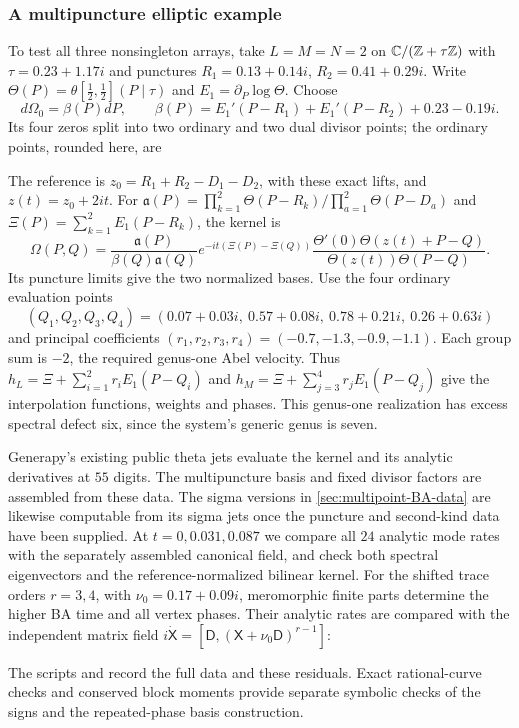 \subsubsection{A multipuncture elliptic example}
\label{sec:numeric-multipoint}

To test all three nonsingleton arrays, take $L=M=N=2$ on
$\mathbb C/(\mathbb Z+\tau\mathbb Z)$ with $\tau=0.23+1.17i$ and punctures
$R_1=0.13+0.14i$, $R_2=0.41+0.29i$.
Write $\Theta(P)=\theta[\frac12,\frac12](P\mid\tau)$ and
$E_1=\partial_P\log\Theta$. Choose
\[
 d\Omega_0=\beta(P)dP,\qquad
 \beta(P)=E_1'(P-R_1)+E_1'(P-R_2)+0.23-0.19i.
\]
Its four zeros split into two ordinary and two dual divisor points;
the ordinary points, rounded here, are

The reference is $z_0=R_1+R_2-D_1-D_2$, with these exact lifts,
and $z(t)=z_0+2it$. For
$\mathfrak a(P)=\prod_{k=1}^{2}\Theta(P-R_k)/
\prod_{a=1}^{2}\Theta(P-D_a)$ and
$\Xi(P)=\sum_{k=1}^{2}E_1(P-R_k)$, the kernel is
\[
 \Omega(P,Q)=\frac{\mathfrak a(P)}{\beta(Q)\mathfrak a(Q)}
 e^{-it(\Xi(P)-\Xi(Q))}
 \frac{\Theta'(0)\Theta(z(t)+P-Q)}{\Theta(z(t))\Theta(P-Q)}.
\]
Its puncture limits give the two normalized bases. Use the four
ordinary evaluation points
\[
 (Q_1,Q_2,Q_3,Q_4)
 =(0.07+0.03i,\ 0.57+0.08i,\ 0.78+0.21i,\ 0.26+0.63i)
\]
and principal coefficients $(r_1,r_2,r_3,r_4)=(-0.7,-1.3,-0.9,-1.1)$.
Each group sum is $-2$, the required genus-one Abel velocity.
Thus $h_L=\Xi+\sum_{i=1}^{2}r_iE_1(P-Q_i)$ and
$h_M=\Xi+\sum_{j=3}^{4}r_jE_1(P-Q_j)$ give the interpolation
functions, weights and phases. This genus-one realization has
excess spectral defect six, since the system's generic genus is seven.

Generapy's existing public theta jets evaluate the kernel and its
analytic derivatives at $55$ digits. The multipuncture basis and
fixed divisor factors are assembled from these data. The sigma versions in
\cref{sec:multipoint-BA-data} are likewise computable from its sigma
jets once the puncture and second-kind data have been supplied.
At $t=0,0.031,0.087$ we compare all $24$ analytic mode rates with
the separately assembled canonical field, and check both spectral
eigenvectors and the reference-normalized bilinear kernel.
For the shifted trace orders $r=3,4$, with $\nu_0=0.17+0.09i$,
meromorphic finite parts determine the higher BA time and all vertex
phases. Their analytic rates are compared with the independent matrix
field $i\dot{\mathsf X}=[\mathsf D,(\mathsf X+\nu_0\mathsf D)^{r-1}]$:

The scripts  and
 record the full data and
these residuals. Exact rational-curve checks and conserved block
moments provide separate symbolic checks of the signs and the
repeated-phase basis construction.

